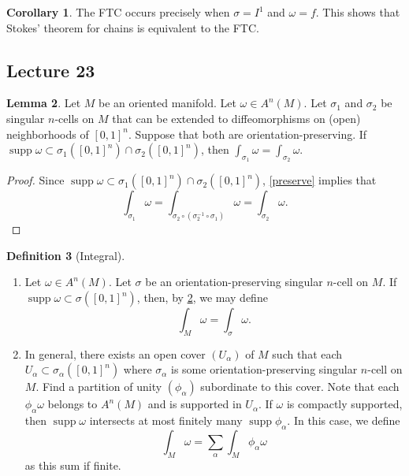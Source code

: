 \documentclass[10pt,letterpaper,cm]{nupset}
\theoremstyle{definition}
\newtheorem{definition}{Definition}[subsection]
\theoremstyle{theorem}
\newtheorem{lemma}[definition]{Lemma}
\newtheorem{corollary}[definition]{Corollary}
\theoremstyle{remark}
\newcommand{\1}{\mathbf{1}}
\newcommand{\0}{\vec 0}
\DeclareMathOperator{\supp}{supp}
\begin{document}
\begin{corollary}
The FTC occurs precisely when $\sigma = I^1$ and $\omega = f$. This shows that Stokes' theorem for chains is equivalent to the FTC.
\end{corollary}

\subsection{Lecture 23}

\begin{lemma}\label{orient}
Let $M$ be an oriented manifold. Let $\omega \in A^n(M)$. Let $\sigma_1$ and $\sigma_2$ be singular $n$-cells on $M$ that can be extended to diffeomorphisms on (open) neighborhoods of $[0,1]^n$. Suppose that both are orientation-preserving. If $\supp \omega \subset  \sigma_1([0,1]^n) \cap \sigma_2([0,1]^n)$, then $\int_{\sigma_1} \omega = \int_{\sigma_2} \omega$.
\end{lemma}
\begin{proof}
Since $\supp \omega \subset  \sigma_1([0,1]^n) \cap \sigma_2([0,1]^n)$, \cref{preserve} implies that $$\int_{\sigma_1} \omega = \int_{\sigma_2 \circ (\sigma_2^{-1} \circ \sigma_1)} \omega  = \int_{\sigma_2} \omega     .$$
\end{proof}

\begin{definition}[Integral]\label{d2} $ $
\begin{enumerate}
\item Let $\omega \in A^n(M)$. Let $\sigma$ be an orientation-preserving singular $n$-cell on $M$. If $\supp \omega \subset \sigma([0,1]^n)$, then, by \cref{orient}, we may define $$\int_M \omega = \int_{\sigma} \omega.$$
\item In general, there exists an open cover $(U_{\alpha})$ of $M$ such that each $U_{\alpha} \subset \sigma_{\alpha}([0,1]^n)$ where $\sigma_{\alpha}$ is some orientation-preserving singular $n$-cell on $M$. Find a partition of unity $(\phi_{\alpha})$ subordinate to this cover. Note that each $\phi_{\alpha} \omega$ belongs to  $A^n(M)$ and is supported in $U_{\alpha}$. If $\omega$ is compactly supported, then $\supp \omega$ intersects at most finitely many $\supp \phi_{\alpha}$. In this case, we define $$\int_M \omega = \sum_{\alpha}  \int_M \phi_{\alpha} \omega$$ as this sum if finite. 
\end{enumerate}
\end{definition}
\end{document}
